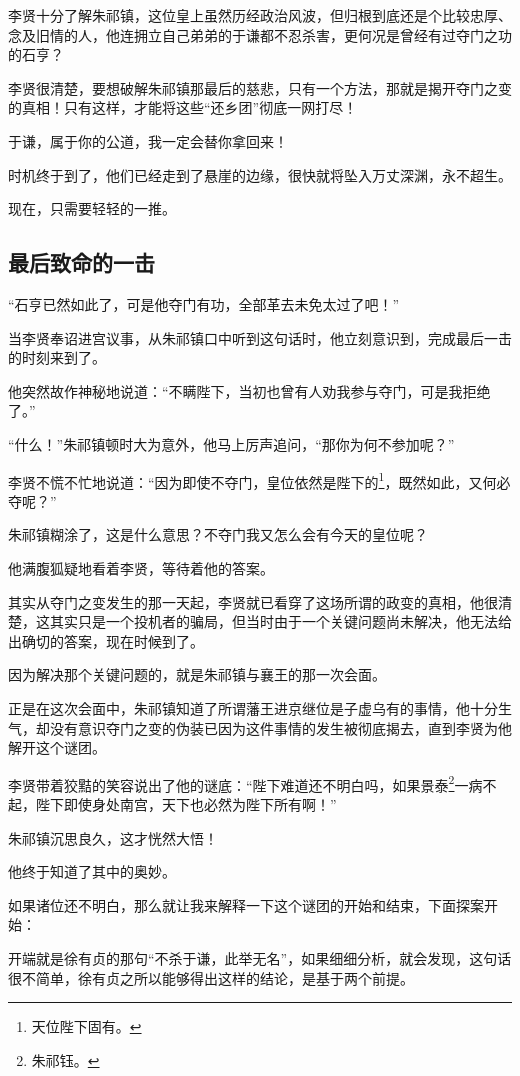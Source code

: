 \begin{multicols}{\theparacolNo}
		李贤十分了解朱祁镇，这位皇上虽然历经政治风波，但归根到底还是个比较忠厚、念及旧情的人，他连拥立自己弟弟的于谦都不忍杀害，更何况是曾经有过夺门之功的石亨？

		李贤很清楚，要想破解朱祁镇那最后的慈悲，只有一个方法，那就是揭开夺门之变的真相！只有这样，才能将这些“还乡团”彻底一网打尽！

		于谦，属于你的公道，我一定会替你拿回来！

		时机终于到了，他们已经走到了悬崖的边缘，很快就将坠入万丈深渊，永不超生。

		现在，只需要轻轻的一推。

		\subsection{最后致命的一击}
		“石亨已然如此了，可是他夺门有功，全部革去未免太过了吧！”

		当李贤奉诏进宫议事，从朱祁镇口中听到这句话时，他立刻意识到，完成最后一击的时刻来到了。

		他突然故作神秘地说道：“不瞒陛下，当初也曾有人劝我参与夺门，可是我拒绝了。”

		“什么！”朱祁镇顿时大为意外，他马上厉声追问，“那你为何不参加呢？”

		李贤不慌不忙地说道：“因为即使不夺门，皇位依然是陛下的\footnote{天位陛下固有。}，既然如此，又何必夺呢？”

		朱祁镇糊涂了，这是什么意思？不夺门我又怎么会有今天的皇位呢？

		他满腹狐疑地看着李贤，等待着他的答案。

		其实从夺门之变发生的那一天起，李贤就已看穿了这场所谓的政变的真相，他很清楚，这其实只是一个投机者的骗局，但当时由于一个关键问题尚未解决，他无法给出确切的答案，现在时候到了。

		因为解决那个关键问题的，就是朱祁镇与襄王的那一次会面。

		正是在这次会面中，朱祁镇知道了所谓藩王进京继位是子虚乌有的事情，他十分生气，却没有意识夺门之变的伪装已因为这件事情的发生被彻底揭去，直到李贤为他解开这个谜团。

		李贤带着狡黠的笑容说出了他的谜底：“陛下难道还不明白吗，如果景泰\footnote{朱祁钰。}一病不起，陛下即使身处南宫，天下也必然为陛下所有啊！”

		朱祁镇沉思良久，这才恍然大悟！

		他终于知道了其中的奥妙。

		如果诸位还不明白，那么就让我来解释一下这个谜团的开始和结束，下面探案开始：

		开端就是徐有贞的那句“不杀于谦，此举无名”，如果细细分析，就会发现，这句话很不简单，徐有贞之所以能够得出这样的结论，是基于两个前提。


\end{multicols}
